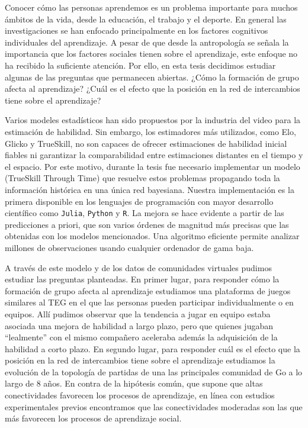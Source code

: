 \documentclass[a4paper,10pt]{book}
\theoremstyle{definition}
\begin{document}

Conocer c\'omo las personas aprendemos es un problema importante para muchos \'ambitos de la vida, desde la educaci\'on, el trabajo y el deporte.
%
En general las investigaciones se han enfocado principalmente en los factores cognitivos individuales del aprendizaje.
%
A pesar de que desde la antropolog\'ia se se\~nala la importancia que los factores sociales tienen sobre el aprendizaje, este enfoque no ha recibido la suficiente atenci\'on.
%
Por ello, en esta tesis decidimos estudiar algunas de las preguntas que permanecen abiertas.
%
¿C\'omo la formaci\'on de grupo afecta al aprendizaje?
%
¿Cu\'al es el efecto que la posici\'on en la red de intercambios tiene sobre el aprendizaje?


Varios modeles estad\'isticos han sido propuestos por la industria del video para la estimaci\'on de habilidad.
%
Sin embargo, los estimadores m\'as utilizados, como Elo, Glicko y TrueSkill, no son capaces de ofrecer estimaciones de habilidad inicial fiables ni garantizar la comparabilidad entre estimaciones distantes en el tiempo y el espacio.
%
Por este motivo, durante la tesis fue necesario implementar un modelo (TrueSkill Through Time) que resuelve estos problemas propagando toda la informaci\'on hist\'orica en una única red bayesiana. 
%
Nuestra implementaci\'on es la primera disponible en los lenguajes de programaci\'on con mayor desarrollo cient\'ifico como \texttt{Julia}, \texttt{Python} y \texttt{R}.
%
La mejora se hace evidente a partir de las predicciones a priori, que son varios \'ordenes de magnitud m\'as precisas que las obtenidas con los modelos mencionados.
%
Una algoritmo eficiente permite analizar millones de observaciones usando cualquier ordenador de gama baja.


A trav\'es de este modelo y de los datos de comunidades virtuales pudimos estudiar las preguntas planteadas.
%
En primer lugar, para responder c\'omo la formaci\'on de grupo afecta al aprendizaje estudiamos una plataforma de juegos similares al TEG en el que las personas pueden participar individualmente o en equipos.
%
All\'i pudimos observar que la tendencia a jugar en equipo estaba asociada una mejora de habilidad a largo plazo, pero que quienes jugaban ``lealmente'' con el mismo compa\~nero aceleraba adem\'as la adquisici\'on de la habilidad a corto plazo.
%
En segundo lugar, para responder cu\'al es el efecto que la posici\'on en la red de intercambios tiene sobre el aprendizaje estudiamos la evoluci\'on de la topolog\'ia de partidas de una las principales comunidad de Go a lo largo de 8 a\~nos.
%
En contra de la hip\'otesis común, que supone que altas conectividades favorecen los procesos de aprendizaje, en l\'inea con estudios experimentales previos encontramos que las conectividades moderadas son las que m\'as favorecen los procesos de aprendizaje social.
\end{document}
